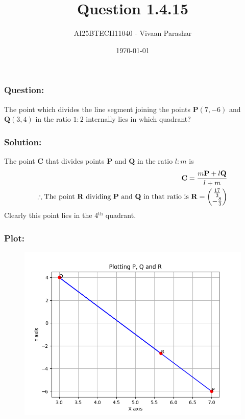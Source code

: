\documentclass{beamer}
\title{Question 1.4.15}
\author{AI25BTECH11040 - Vivaan Parashar}
\date{\today}
\begin{document}
\frame{\titlepage}

\begin{frame}
    \frametitle{Question: }
    The point which divides the line segment joining the points $\mathbf{P}(7, -6)$ and $\mathbf{Q}(3, 4)$ in the ratio $1 : 2$ internally lies in which quadrant?
\end{frame}

\begin{frame}
    \frametitle{Solution: }
    The point $\mathbf{C}$ that divides points $\mathbf{P}$ and $\mathbf{Q}$ in the ratio $l : m$ is
    \begin{align}
        \mathbf{C} = \frac{m\mathbf{P} + l\mathbf{Q}}{l+m}                                                                                 \\
        \therefore \text{The point $\mathbf{R}$ dividing $\mathbf{P}$ and $\mathbf{Q}$ in that ratio is } \mathbf{R} = \begin{pmatrix}\frac{17}{3} \\-\frac{8}{3}\end{pmatrix}
    \end{align}
    Clearly this point lies in the 4$^\text{th}$ quadrant.
\end{frame}

\begin{frame}
    \frametitle{Plot: }
    \begin{figure}
        \includegraphics[scale=0.5]{figs/plot.png}
    \end{figure}
\end{frame}
\end{document}
